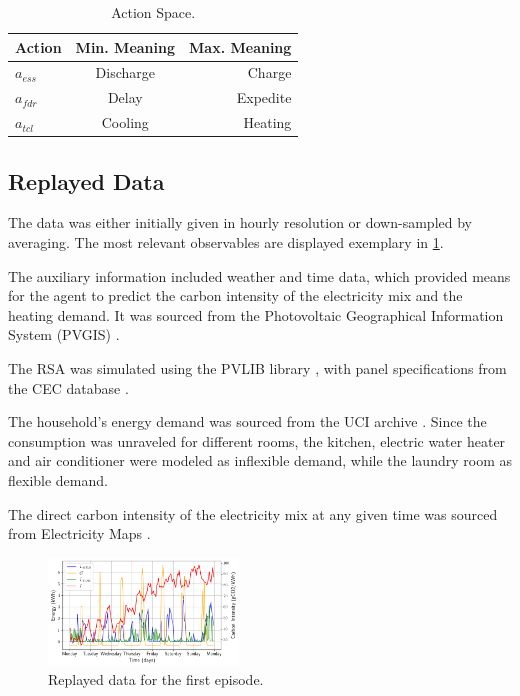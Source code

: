     \begin{table}
    \caption{Action Space.}
    \label{tab:action_space}
    \vskip 0.15in
    \begin{center}
    \begin{small}
    \begin{sc}
    \begin{tabular}{lcr}
    \toprule
    Action & Min. Meaning & Max. Meaning\\
    \midrule
    $a_{ess}$ & Discharge & Charge \\ 
        $a_{fdr}$ & Delay     & Expedite \\
        $a_{tcl}$ & Cooling   & Heating\\
    \bottomrule
    \end{tabular}
    \end{sc}
    \end{small}
    \end{center}
    \vskip -0.1in
    \end{table}

\subsection{Replayed Data}\label{ssec:static_components}
The data was either initially given in hourly resolution or down-sampled by averaging. The most relevant observables are displayed exemplary in \cref{fig:static_components}.
\par
The auxiliary information included weather and time data, which provided means for the agent to predict the carbon intensity of the electricity mix and the heating demand. It was sourced from the Photovoltaic Geographical Information System (PVGIS) \cite{ThomasHuld.2012}.
\par
The RSA was simulated using the PVLIB library \cite{F.Holmgren.2018}, with panel specifications from the CEC database \cite{Dobos.2012}\cite{Boyson.2007}.
\par
The household's energy demand was sourced from the UCI archive \cite{GeorgesHebrail.2006}. Since the consumption was unraveled for different rooms, the kitchen, electric water heater and air conditioner were modeled as inflexible demand, while the laundry room as flexible demand.
\par
The direct carbon intensity of the electricity mix at any given time was sourced from Electricity Maps \cite{ElectricityMaps.2023}. 
\begin{figure}[H]
    \centering
    \setlength{\abovecaptionskip}{0pt}
    \includegraphics[width=0.45\textwidth]{figures/static_components.png}
    \caption{Replayed data for the first episode.}
    \label{fig:static_components}
\end{figure}

